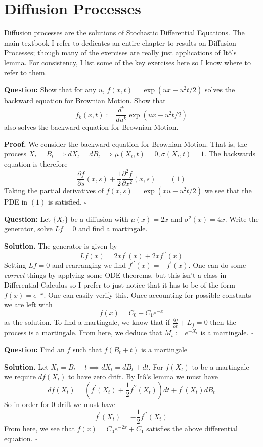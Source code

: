 \documentclass{article}
\begin{document}
\newpage
\section{Diffusion Processes}

Diffusion processes are the solutions of Stochastic Differential Equations. The main textbook I refer to \cite{Fima} dedicates an entire chapter to results on Diffusion Processes; though many of the exercises are really just applications of Itô's lemma. For consistency, I list some of the key exercises here so I know where to refer to them.

\begin{tcolorbox}[colframe=black,colback=gray!5,boxrule=0.5pt]
\textbf{Question:} Show that for any $u$, $f(x,t) = \exp(ux-u^2t/2)$ solves the backward equation for Brownian Motion. Show that 
$$f_k(x,t) := \frac{d^k}{du^k}\exp(ux-u^2t/2)$$
also solves the backward equation for Brownian Motion.
\end{tcolorbox}
\textbf{Proof.} We consider the backward equation for Brownian Motion. That is, the process $X_t = B_t\implies dX_t=dB_t\implies\mu(X_t,t)=0,\sigma(X_t,t)=1$. The backwards equation is therefore
$$\frac{\partial f}{\partial s}(x,s) + \frac{1}{2}\frac{\partial^2 f}{\partial x^2}(x,s) \quad\quad (1)$$
Taking the partial derivatives of $f(x,s) = \exp(xu - u^2t/2)$ we see that the PDE in $(1)$ is satisfied. $\square$

\begin{tcolorbox}[colframe=black,colback=gray!5,boxrule=0.5pt]
\textbf{Question:} Let $\{X_t\}$ be a diffusion with $\mu(x) = 2x$ and $\sigma^2(x) = 4x$. Write the generator, solve $Lf=0$ and find a martingale.  
\end{tcolorbox}
\textbf{Solution.} The generator is given by
$$Lf(x) = 2x f^\prime(x) + 2xf^{\prime\prime}(x)$$
Setting $Lf=0$ and rearranging we find $f^{\prime \prime}(x) = -f^\prime(x)$. One can do some \textit{correct} things by applying some ODE theorems, but this isn't a class in Differential Calculus so I prefer to just notice that it has to be of the form $f(x) = e^{-x}$. One can easily verify this. Once accounting for possible constants we are left with 
$$f(x) = C_0 + C_1e^{-x}$$
as the solution. To find a martingale, we know that if $\frac{\partial f}{\partial t} + L_f=0$ then the process is a martingale. From here, we deduce that $M_t := e^{-X_t}$ is a martingale. $\square$


\begin{tcolorbox}[colframe=black,colback=gray!5,boxrule=0.5pt]
\textbf{Question:} Find an $f$ such that $f(B_t + t)$ is a martingale
\end{tcolorbox}
\textbf{Solution.} Let $X_t = B_t +t\implies dX_t=dB_t+dt$. For $f(X_t)$ to be a martingale we require $df(X_t)$ to have zero drift. By Itô's lemma we must have
$$df(X_t) = \left(f^\prime(X_t) +\frac{1}{2}f^{\prime\prime}(X_t)\right)dt + f^\prime(X_t)dB_t$$
So in order for $0$ drift we must have 
$$f^\prime(X_t) = -\frac{1}{2}f^{\prime\prime}(X_t)$$
From here, we see that $f(x) = C_0e^{-2x} + C_1$ satisfies the above differential equation. $\square$
\end{document}
